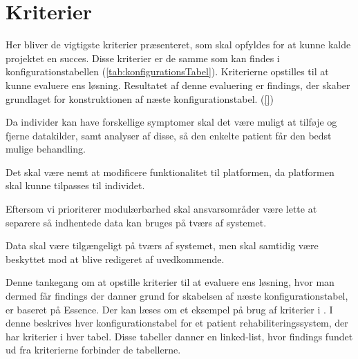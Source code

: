 \section{Kriterier}\label{firstsubseckriterier}
Her bliver de vigtigste kriterier præsenteret, som skal opfyldes for at kunne kalde projektet en succes.
Disse kriterier er de samme som kan findes i konfigurationstabellen (\cref{tab:konfigurationsTabel}).
Kriterierne opstilles til at kunne evaluere ens løsning.
Resultatet af denne evaluering er findings, der skaber grundlaget for konstruktionen af næste konfigurationstabel. (\cref{})



\begin{description}[style=nextline]
	\item[Modulær] 
	Da individer kan have forskellige symptomer skal det være muligt at tilføje og fjerne datakilder, samt analyser af disse, så den enkelte patient får den bedst mulige behandling.
	\item[Fleksibel]
	Det skal være nemt at modificere funktionalitet til platformen, da platformen skal kunne tilpasses til individet.
	\item[Kombinerbar] Eftersom vi prioriterer modulærbarhed skal ansvarsområder være lette at separere så indhentede data kan bruges på tværs af systemet.
	\item[Kommunikativ] Data skal være tilgængeligt på tværs af systemet, men skal samtidig være beskyttet mod at blive redigeret af uvedkommende.
\end{description}

Denne tankegang om at opstille kriterier til at evaluere ens løsning, hvor man dermed får findings der danner grund for skabelsen af næste konfigurationstabel, er baseret på Essence.
Der kan læses om et eksempel på brug af kriterier i \citet[Kapitel 2.2, 2.3, 2.4 og 2.5 side 16--21]{art:essence}.
I denne beskrives hver konfigurationstabel for et patient rehabiliteringssystem, der har kriterier i hver tabel.
Disse tabeller danner en linked-list, hvor findings fundet ud fra kriterierne forbinder de tabellerne.

